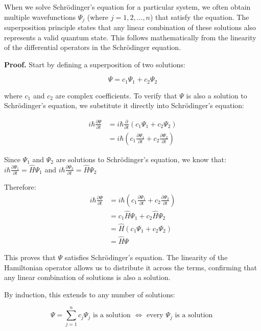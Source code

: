 When we solve Schrödinger's equation for a particular system, we often obtain multiple wavefunctions $\Psi_{j}$ (where $j=1,2, \ldots, n$) that satisfy the equation. The superposition principle states that any linear combination of these solutions also represents a valid quantum state. This follows mathematically from the linearity of the differential operators in the Schrödinger equation.

\textbf{Proof.} Start by defining a superposition of two solutions:

\begin{equation}
\Psi=c_{1} \Psi_{1}+c_{2} \Psi_{2}
\end{equation}

where $c_1$ and $c_2$ are complex coefficients. To verify that $\Psi$ is also a solution to Schrödinger's equation, we substitute it directly into Schrödinger's equation:

\begin{align}
i \hbar \frac{\partial \Psi}{\partial t} &= i \hbar \frac{\partial}{\partial t}\left(c_{1} \Psi_{1}+c_{2} \Psi_{2}\right) \\
&= i \hbar\left(c_{1} \frac{\partial \Psi_{1}}{\partial t}+c_{2} \frac{\partial \Psi_{2}}{\partial t}\right)
\end{align}

Since $\Psi_1$ and $\Psi_2$ are solutions to Schrödinger's equation, we know that:
$i \hbar \frac{\partial \Psi_1}{\partial t} = \hat{H}\Psi_1$ and $i \hbar \frac{\partial \Psi_2}{\partial t} = \hat{H}\Psi_2$

Therefore:
\begin{align}
i \hbar \frac{\partial \Psi}{\partial t} &= i \hbar\left(c_{1} \frac{\partial \Psi_{1}}{\partial t}+c_{2} \frac{\partial \Psi_{2}}{\partial t}\right) \\
&= c_{1} \hat{H} \Psi_{1}+c_{2} \hat{H} \Psi_{2} \\
&= \hat{H}\left(c_{1} \Psi_{1}+c_{2} \Psi_{2}\right) \\
&= \hat{H} \Psi
\end{align}

This proves that $\Psi$ satisfies Schrödinger's equation. The linearity of the Hamiltonian operator allows us to distribute it across the terms, confirming that any linear combination of solutions is also a solution.

By induction, this extends to any number of solutions:

\begin{equation}
\Psi=\sum_{j=1}^{n} c_{j} \Psi_{j} \text{ is a solution } \Longleftrightarrow \text{ every } \Psi_{j} \text{ is a solution }
\end{equation}


